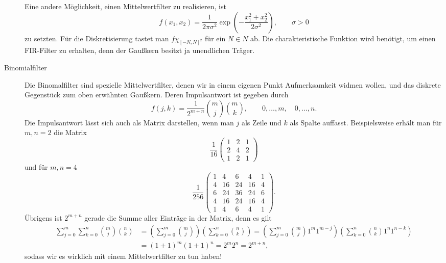 \begin{example}
\begin{description}
  Eine andere Möglichkeit, einen Mittelwertfilter zu realisieren, ist
  \[
    f(x_{1},x_{2}) 
      = \frac{1}{2\pi\sigma^{2}} \exp\left( -\frac{x_{1}^{2} + x_{2}^{2}}{2\sigma^{2}} \right),
      \qquad \sigma > 0
  \]
  zu setzten. Für die Diskretisierung tastet man $ f\chi_{[-N,N]^{2}} $ für ein $ N \in N $ ab. Die
  charakteristische Funktion wird benötigt, um einen FIR-Filter zu erhalten, denn der Gaußkern
  besitzt ja unendlichen Träger.
\item [Binomialfilter]
  Die Binomalfilter sind spezielle Mittelwertfilter, denen wir in einem eigenen Punkt 
  Aufmerksamkeit widmen wollen, und das diskrete Gegenstück zum oben erwähnten Gaußkern. Deren 
  Impulsantwort ist gegeben durch
  \[
    f(j,k) = \frac{1}{2^{m + n}} \binom{m}{j} \binom{m}{k},
      \qquad 0, \ldots, m, \quad 0, \ldots, n.
  \]
  Die Impulsantwort lässt sich auch als Matrix darstellen, wenn man $ j $ als Zeile und $ k $ als
  Spalte auffasst. Beispielsweise erhält man für $ m,n = 2 $ die Matrix
  \[
    \frac{1}{16} \begin{pmatrix}
    1 & 2 & 1 \\
    2 & 4 & 2 \\
    1 & 2 & 1
    \end{pmatrix}
  \]
  und für $ m,n=4 $
  \[
    \frac{1}{256} \begin{pmatrix}
    1 &  4 & 6  & 4  & 1 \\
    4 & 16 & 24 & 16 & 4 \\
    6 & 24 & 36 & 24 & 6 \\
    4 & 16 & 24 & 16 & 4 \\
    1 &  4 &  6 &  4 & 1
    \end{pmatrix}.
  \]
  Übrigens ist $ 2^{m + n} $ gerade die Summe aller Einträge in der Matrix, denn es gilt
  \begin{align*}
      \sum_{j = 0}^{m} \sum_{k = 0}^{n} \binom{m}{j} \binom{n}{k}
   &= \left( \sum_{j = 0}^{m} \binom{m}{j} \right) \left( \sum_{k = 0}^{n} \binom{n}{k} \right)
    = \left( \sum_{j = 0}^{m} \binom{m}{j} 1^{m} 1^{m - j} \right) 
        \left( \sum_{k = 0}^{n} \binom{n}{k} 1^{n} 1^{n - k} \right) \\
   &= (1 + 1)^{m} (1 + 1)^{n}
    = 2^{m} 2^{n}
    = 2^{m + n},
  \end{align*}
  sodass wir es wirklich mit einem Mittelwertfilter zu tun haben!
\end{description}
\end{example}